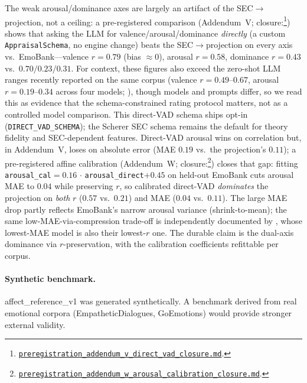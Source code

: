 \documentclass[11pt]{article}
\newcommand{\repourl}{https://github.com/gianlucamazza/emotional-memory}%
\begin{document}
The weak arousal/dominance axes are largely an artifact of the SEC$\to$projection, not a
ceiling: a pre-registered comparison (Addendum~V; closure:\footnote{%
\href{\repourl/blob/main/benchmarks/preregistration\_addendum\_v\_direct\_vad\_closure.md}%
{\texttt{preregistration\_addendum\_v\_direct\_vad\_closure.md}}.}) shows that asking the LLM
for valence/arousal/dominance \emph{directly} (a custom \texttt{AppraisalSchema}, no engine
change) beats the SEC$\to$projection on every axis vs.\ EmoBank---valence $r=0.79$ (bias
${\approx}0$), arousal $r=0.58$, dominance $r=0.43$ vs.\ $0.70/0.23/0.31$. For context,
these figures also exceed the zero-shot LLM ranges recently reported on the same corpus
(valence $r=0.49$--$0.67$, arousal $r=0.19$--$0.34$ across four models;
\citealp{inoshita2026labels}), though models and prompts differ, so we read this as
evidence that the schema-constrained rating protocol matters, not as a controlled
model comparison. This direct-VAD
schema ships opt-in (\texttt{DIRECT\_VAD\_SCHEMA}); the Scherer SEC schema remains the default
for theory fidelity and SEC-dependent features.
Direct-VAD arousal wins on correlation but, in Addendum~V, loses on absolute error
(MAE $0.19$ vs.\ the projection's $0.11$); a pre-registered affine calibration
(Addendum~W; closure:\footnote{%
\href{\repourl/blob/main/benchmarks/preregistration\_addendum\_w\_arousal\_calibration\_closure.md}%
{\texttt{preregistration\_addendum\_w\_arousal\_calibration\_closure.md}}.}) closes that gap:
fitting \texttt{arousal\_cal}${=}0.16\,{\cdot}\,$\texttt{arousal\_direct}${+}0.45$ on held-out
EmoBank cuts arousal MAE to $0.04$ while preserving $r$, so calibrated direct-VAD
\emph{dominates} the projection on \emph{both} $r$ ($0.57$ vs.\ $0.21$) and MAE
($0.04$ vs.\ $0.11$). The large MAE drop partly reflects EmoBank's narrow arousal variance
(shrink-to-mean); the same low-MAE-via-compression trade-off is independently documented
by \citet{inoshita2026labels}, whose lowest-MAE model is also their lowest-$r$ one. The
durable claim is the dual-axis dominance via $r$-preservation, with the
calibration coefficients refittable per corpus.

\paragraph{Synthetic benchmark.}
affect\_reference\_v1 was generated synthetically. A benchmark derived from
real emotional corpora (EmpatheticDialogues, GoEmotions) would provide stronger
external validity.
\end{document}
